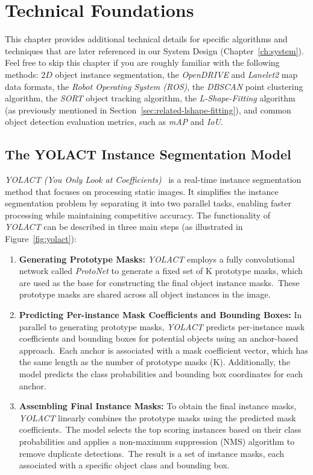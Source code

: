 
\chapter{Technical Foundations}
\label{ch:tech}

This chapter provides additional technical details for specific algorithms and techniques that are later referenced in our System Design (Chapter~\ref{ch:system}). Feel free to skip this chapter if you are roughly familiar with the following methods: $2D$ object instance segmentation, the \textit{OpenDRIVE} and \textit{Lanelet2} map data formats, the \textit{Robot Operating System (ROS)}, the \textit{DBSCAN} point clustering algorithm, the \textit{SORT} object tracking algorithm, the \textit{L-Shape-Fitting} algorithm (as previously mentioned in Section~\ref{sec:related-lshape-fitting}), and common object detection evaluation metrics, such as \textit{mAP} and \textit{IoU}.

\section{The YOLACT Instance Segmentation Model}
\label{sec:yolact}

\textit{YOLACT (You Only Look at Coefficients)}~\cite{bolya2019yolact} is a real-time instance segmentation method that focuses on processing static images.
It simplifies the instance segmentation problem by separating it into two parallel tasks, enabling faster processing while maintaining competitive accuracy.
The functionality of \textit{YOLACT} can be described in three main steps (as illustrated in Figure~\ref{fig:yolact}):

\begin{enumerate}
    \item \textbf{Generating Prototype Masks:} \textit{YOLACT} employs a fully convolutional network called \textit{ProtoNet} to generate a fixed set of K prototype masks, which are used as the base for constructing the final object instance masks.\ These prototype masks are shared across all object instances in the image.
    \item \textbf{Predicting Per-instance Mask Coefficients and Bounding Boxes:} In parallel to generating prototype masks, \textit{YOLACT} predicts per-instance mask coefficients and bounding boxes for potential objects using an anchor-based approach.\ Each anchor is associated with a mask coefficient vector, which has the same length as the number of prototype masks (K). Additionally, the model predicts the class probabilities and bounding box coordinates for each anchor.
    \item \textbf{Assembling Final Instance Masks:} To obtain the final instance masks, \textit{YOLACT} linearly combines the prototype masks using the predicted mask coefficients.\ The model selects the top scoring instances based on their class probabilities and applies a non-maximum suppression (NMS) algorithm to remove duplicate detections.\ The result is a set of instance masks, each associated with a specific object class and bounding box.
\end{enumerate}

